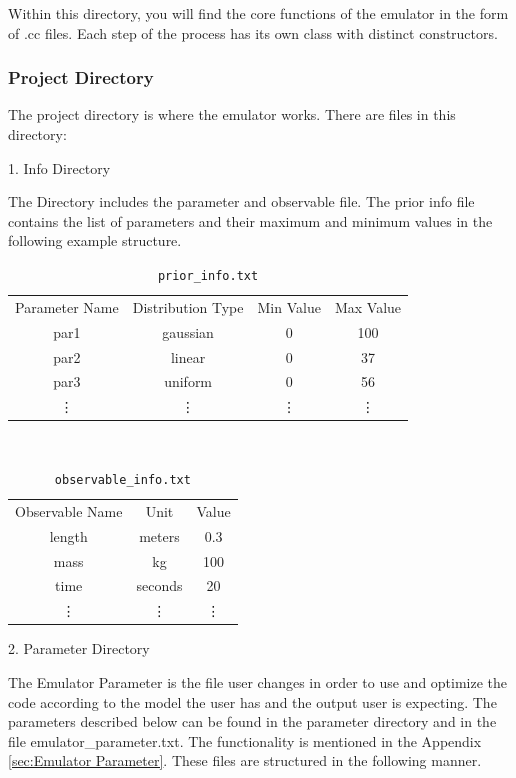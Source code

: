 \documentclass[12pt]{article}
\numberwithin{equation}{section}
\numberwithin{figure}{section}
\begin{document}
Within this directory, you will find the core functions of the emulator in the form of .cc files. Each step of the process has its own class with distinct constructors.  

\newpage

\subsubsection{Project Directory}
The project directory is where the emulator works. There are files in this directory: 

1. Info Directory 

The Directory includes the parameter and observable file. 
The prior info file contains the list of parameters and their maximum and minimum values in the following example structure. 

\begin{table}[!h]
    \centering
    \begin{tabular}{c|c|c|c}
         Parameter Name & Distribution Type & Min Value & Max Value \\
         par1 & gaussian & 0 & 100\\
         par2 & linear & 0 & 37 \\
         par3 & uniform & 0 &  56 \\
          \vdots & \vdots & \vdots & \vdots
    \end{tabular}
    \caption{{\tt{prior\_info.txt}}}
    \label{tab:my_label}
\end{table}

 \\ 
 
\begin{table}[!h]
    \centering
    \begin{tabular}{c|c|c}
         Observable Name & Unit & Value\\
         length & meters & 0.3 \\
         mass & kg & 100 \\
         time & seconds & 20 \\
          \vdots & \vdots & \vdots 
    \end{tabular}
    \caption{{\tt{observable\_info.txt}}}
    \label{tab:my_label}
\end{table}

2. Parameter Directory 

The Emulator Parameter is the file user changes in order to use and optimize the code according to the model the user has and the output user is expecting. The parameters described below can be found in the parameter directory and in the file emulator\_parameter.txt. The functionality is mentioned in the Appendix \ref{sec:Emulator Parameter}. These files are structured in the following manner.
\end{document}
